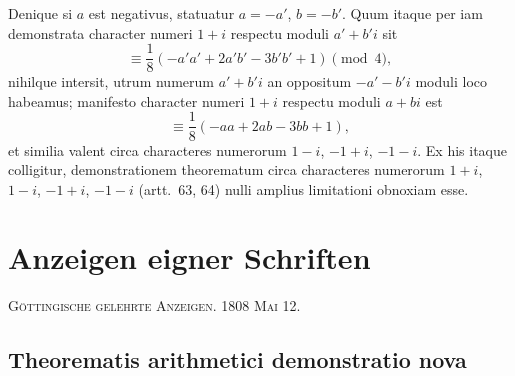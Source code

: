 \documentclass[12pt]{article}
\begin{document}
Denique si $a$ est negativus, statuatur $a=-a'$, $b=-b'$. Quum itaque per iam demonstrata character numeri $1+i$ respectu moduli $a'+b'i$ sit
\[
\equiv \frac18(-a'a'+2a'b'-3b'b'+1)\pmod4,
\]
nihilque intersit, utrum numerum $a'+b'i$ an oppositum $-a'-b'i$ moduli loco habeamus; manifesto character numeri $1+i$ respectu moduli $a+bi$ est
\[
\equiv \frac18(-aa+2ab-3bb+1),
\]
et similia valent circa characteres numerorum $1-i$, $-1+i$, $-1-i$. Ex his itaque colligitur, demonstrationem theorematum circa characteres numerorum $1+i$, $1-i$, $-1+i$, $-1-i$ (artt.~63, 64) nulli amplius limitationi obnoxiam esse.


\clearpage
{}

\section*{Anzeigen eigner Schriften}

\begin{center}
\textsc{Göttingische gelehrte Anzeigen. 1808 Mai 12.}
\end{center}

\subsection*{Theorematis arithmetici demonstratio nova}
\end{document}
